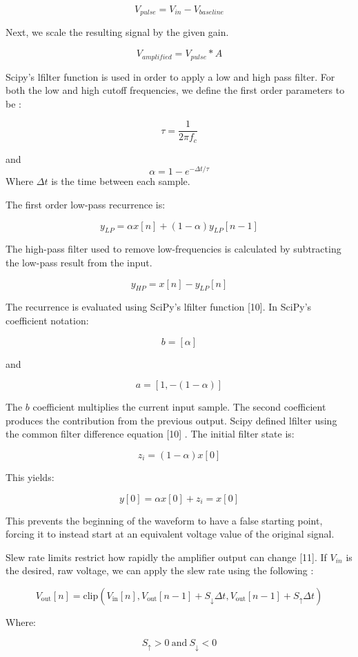 \documentclass[10pt]{article}
\begin{document}
$$
V_{pulse} = V_{in} - V_{baseline} 
$$

Next, we scale the resulting signal by the given gain.

$$
V_{amplified} = V_{pulse} * A
$$

Scipy's lfilter function is used in order to apply a low and high pass filter. For both the low and high cutoff frequencies, we define the first order parameters to be :  

$$
\tau = \frac{1}{2\pi f_c}
$$

and 
$$
\alpha = 1 - e^{-\Delta t /\tau}
$$
Where $\Delta t$ is the time between each sample. 

The first order low-pass recurrence is:

$$
y_{LP} = \alpha x[n] + (1 - \alpha)y_{LP}[n-1] 
$$


The high-pass filter used to remove low-frequencies is calculated by subtracting the low-pass result from the input. 


$$
y_{HP} = x[n] - y_{LP}[n]
$$

The recurrence is evaluated using SciPy's lfilter function [10]. In SciPy's coefficient notation:


$$
b = [\alpha]
$$

and 

$$
a = [1, -(1-\alpha)]
$$

The $b$ coefficient multiplies the current input sample. The second coefficient produces the contribution from the previous output. Scipy defined lfilter using the common filter difference equation [10] . 
The initial filter state is: 

$$
z_i = (1 - \alpha) x[0]
$$


This yields:

$$
y[0] = \alpha x[0] + z_i = x[0]
$$

This prevents the beginning of the waveform to have a false starting point, forcing it to instead start at an equivalent voltage value of the original signal. 

Slew rate limits restrict how rapidly the amplifier output can change [11]. If $V_{in}$ is the desired, raw voltage, we can apply the slew rate using the following :

$$
V_{\text{out}}[n] = \text{clip}( V_{\text{in}}[n], V_{\text{out}}[n-1] + S_{\downarrow} \Delta t, V_{\text{out}}[n-1] + S_{\uparrow} \Delta t )
$$

Where:

$$
S_{\uparrow} > 0 \ \text{and} \ S_{\downarrow} < 0 
$$
\end{document}
